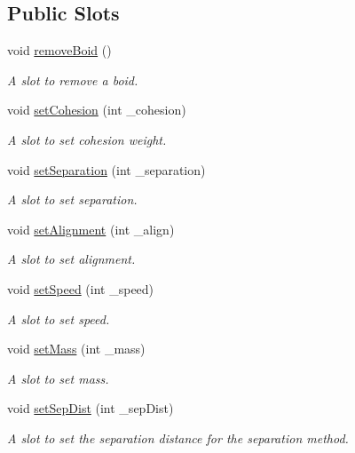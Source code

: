 \subsection*{Public Slots}
\begin{DoxyCompactItemize}
\item 
\hypertarget{classNGLScene_a8652734544a0635612103759b4ad5cad}{void \hyperlink{classNGLScene_a8652734544a0635612103759b4ad5cad}{remove\-Boid} ()}\label{classNGLScene_a8652734544a0635612103759b4ad5cad}

\begin{DoxyCompactList}\small\item\em A slot to remove a boid. \end{DoxyCompactList}\item 
void \hyperlink{classNGLScene_a5e08b4415869e9c4cf73c49c02f33948}{set\-Cohesion} (int \-\_\-cohesion)
\begin{DoxyCompactList}\small\item\em A slot to set cohesion weight. \end{DoxyCompactList}\item 
void \hyperlink{classNGLScene_af12eae745b8b0f0b199a98ad4eb59d8c}{set\-Separation} (int \-\_\-separation)
\begin{DoxyCompactList}\small\item\em A slot to set separation. \end{DoxyCompactList}\item 
void \hyperlink{classNGLScene_a9f5e5754ca687a66725e5ec05883ec6c}{set\-Alignment} (int \-\_\-align)
\begin{DoxyCompactList}\small\item\em A slot to set alignment. \end{DoxyCompactList}\item 
void \hyperlink{classNGLScene_aeb6a3e90a1db49beef452ca4c3b92de7}{set\-Speed} (int \-\_\-speed)
\begin{DoxyCompactList}\small\item\em A slot to set speed. \end{DoxyCompactList}\item 
void \hyperlink{classNGLScene_a412a3b478a7a2838f6c5096fbbd20095}{set\-Mass} (int \-\_\-mass)
\begin{DoxyCompactList}\small\item\em A slot to set mass. \end{DoxyCompactList}\item 
\hypertarget{classNGLScene_aa25f3abf87cb93d42850b68edbbf6965}{void \hyperlink{classNGLScene_aa25f3abf87cb93d42850b68edbbf6965}{set\-Sep\-Dist} (int \-\_\-sep\-Dist)}\label{classNGLScene_aa25f3abf87cb93d42850b68edbbf6965}

\begin{DoxyCompactList}\small\item\em A slot to set the separation distance for the separation method. \end{DoxyCompactList}\end{DoxyCompactItemize}
